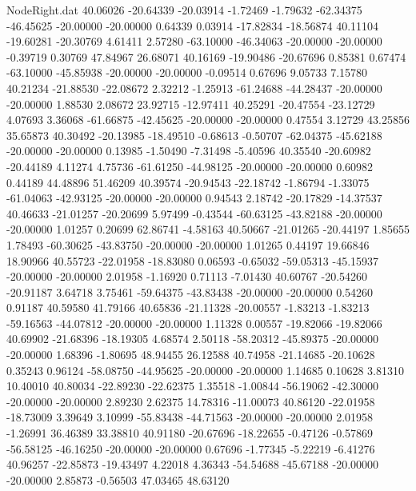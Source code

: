 \begin{filecontents}{NodeRight.dat}
  40.06026  -20.64339  -20.03914    -1.72469   -1.79632  -62.34375  -46.45625  -20.00000  -20.00000    0.64339    0.03914  -17.82834  -18.56874
  40.11104  -19.60281  -20.30769     4.61411    2.57280  -63.10000  -46.34063  -20.00000  -20.00000   -0.39719    0.30769   47.84967   26.68071
  40.16169  -19.90486  -20.67696     0.85381    0.67474  -63.10000  -45.85938  -20.00000  -20.00000   -0.09514    0.67696    9.05733    7.15780
  40.21234  -21.88530  -22.08672     2.32212   -1.25913  -61.24688  -44.28437  -20.00000  -20.00000    1.88530    2.08672   23.92715  -12.97411
  40.25291  -20.47554  -23.12729     4.07693    3.36068  -61.66875  -42.45625  -20.00000  -20.00000    0.47554    3.12729   43.25856   35.65873
  40.30492  -20.13985  -18.49510    -0.68613   -0.50707  -62.04375  -45.62188  -20.00000  -20.00000    0.13985   -1.50490   -7.31498   -5.40596
  40.35540  -20.60982  -20.44189     4.11274    4.75736  -61.61250  -44.98125  -20.00000  -20.00000    0.60982    0.44189   44.48896   51.46209
  40.39574  -20.94543  -22.18742    -1.86794   -1.33075  -61.04063  -42.93125  -20.00000  -20.00000    0.94543    2.18742  -20.17829  -14.37537
  40.46633  -21.01257  -20.20699     5.97499   -0.43544  -60.63125  -43.82188  -20.00000  -20.00000    1.01257    0.20699   62.86741   -4.58163
  40.50667  -21.01265  -20.44197     1.85655    1.78493  -60.30625  -43.83750  -20.00000  -20.00000    1.01265    0.44197   19.66846   18.90966
  40.55723  -22.01958  -18.83080     0.06593   -0.65032  -59.05313  -45.15937  -20.00000  -20.00000    2.01958   -1.16920    0.71113   -7.01430
  40.60767  -20.54260  -20.91187     3.64718    3.75461  -59.64375  -43.83438  -20.00000  -20.00000    0.54260    0.91187   40.59580   41.79166
  40.65836  -21.11328  -20.00557    -1.83213   -1.83213  -59.16563  -44.07812  -20.00000  -20.00000    1.11328    0.00557  -19.82066  -19.82066
  40.69902  -21.68396  -18.19305     4.68574    2.50118  -58.20312  -45.89375  -20.00000  -20.00000    1.68396   -1.80695   48.94455   26.12588
  40.74958  -21.14685  -20.10628     0.35243    0.96124  -58.08750  -44.95625  -20.00000  -20.00000    1.14685    0.10628    3.81310   10.40010
  40.80034  -22.89230  -22.62375     1.35518   -1.00844  -56.19062  -42.30000  -20.00000  -20.00000    2.89230    2.62375   14.78316  -11.00073
  40.86120  -22.01958  -18.73009     3.39649    3.10999  -55.83438  -44.71563  -20.00000  -20.00000    2.01958   -1.26991   36.46389   33.38810
  40.91180  -20.67696  -18.22655    -0.47126   -0.57869  -56.58125  -46.16250  -20.00000  -20.00000    0.67696   -1.77345   -5.22219   -6.41276
  40.96257  -22.85873  -19.43497     4.22018    4.36343  -54.54688  -45.67188  -20.00000  -20.00000    2.85873   -0.56503   47.03465   48.63120

\end{filecontents}
